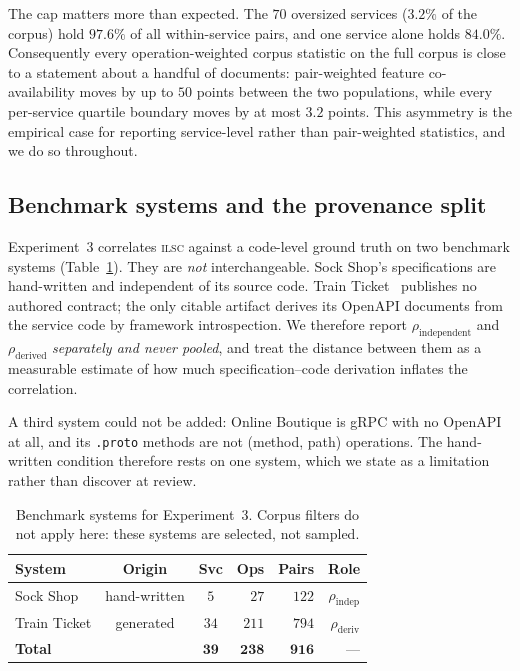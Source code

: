 \documentclass[journal]{IEEEtran}
\newcommand{\ilsc}{\textsc{ilsc}}
\newcommand{\code}[1]{\texttt{\small #1}}
\begin{document}
The cap matters more than expected. The $70$ oversized services ($3.2\%$ of the
corpus) hold $97.6\%$ of all within-service pairs, and one service alone holds
$84.0\%$. Consequently every operation-weighted corpus statistic on the full
corpus is close to a statement about a handful of documents: pair-weighted
feature co-availability moves by up to $50$ points between the two populations,
while every per-service quartile boundary moves by at most $3.2$ points. This
asymmetry is the empirical case for reporting service-level rather than
pair-weighted statistics, and we do so throughout.

\subsection{Benchmark systems and the provenance split}
\label{sec:design-bench}
Experiment~3 correlates \ilsc{} against a code-level ground truth on two
benchmark systems (Table~\ref{tab:bench}). They are \emph{not} interchangeable.
Sock Shop's specifications are hand-written and independent of its source code.
Train Ticket~\cite{zhou2021fault} publishes no authored contract; the only
citable artifact derives its OpenAPI documents from the service code by
framework introspection. We therefore report $\rho_{\mathrm{independent}}$ and
$\rho_{\mathrm{derived}}$ \emph{separately and never pooled}, and treat the
distance between them as a measurable estimate of how much specification--code
derivation inflates the correlation.

A third system could not be added: Online Boutique is gRPC with no OpenAPI at
all, and its \code{.proto} methods are not (method, path) operations. The
hand-written condition therefore rests on one system, which we state as a
limitation rather than discover at review.

\begin{table}[!t]
\caption{Benchmark systems for Experiment~3. Corpus filters do not apply here:
these systems are selected, not sampled.}
\label{tab:bench}
\centering
\footnotesize
\begin{tabular}{@{}lccrrr@{}}
\toprule
\textbf{System} & \textbf{Origin} & \textbf{Svc} & \textbf{Ops} &
\textbf{Pairs} & \textbf{Role} \\
\midrule
Sock Shop & hand-written & $5$ & $27$ & $122$ & $\rho_{\mathrm{indep}}$ \\
Train Ticket & generated & $34$ & $211$ & $794$ & $\rho_{\mathrm{deriv}}$ \\
\midrule
\textbf{Total} & & $\mathbf{39}$ & $\mathbf{238}$ & $\mathbf{916}$ & --- \\
\bottomrule
\end{tabular}
\end{table}
\end{document}

